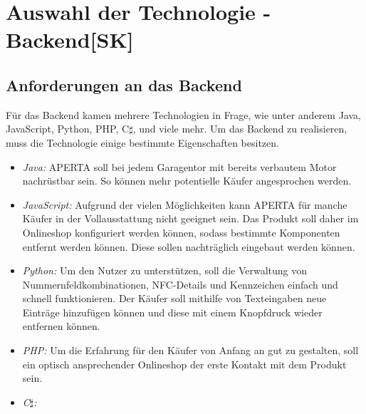 \section{Auswahl der Technologie - Backend[SK]}
\subsection{Anforderungen an das Backend}
Für das Backend kamen mehrere Technologien in Frage, wie unter anderem Java, JavaScript, Python, PHP, C$\sharp$, und viele mehr. 
Um das Backend zu realisieren, muss die Technologie einige bestimmte Eigenschaften besitzen. 
\begin{itemize}
    \item \textit{Java:} APERTA soll bei jedem Garagentor mit bereits verbautem Motor nachrüstbar sein. So können mehr potentielle Käufer angesprochen werden.
    \item \textit{JavaScript:} Aufgrund der vielen Möglichkeiten kann APERTA für manche Käufer in der Vollausstattung nicht geeignet sein. Das Produkt soll daher im Onlineshop konfiguriert werden können, sodass bestimmte Komponenten entfernt werden können. Diese sollen nachträglich eingebaut werden können.
    \item \textit{Python:} Um den Nutzer zu unterstützen, soll die Verwaltung von Nummernfeldkombinationen, NFC-Details und Kennzeichen einfach und schnell funktionieren. Der Käufer soll mithilfe von Texteingaben neue Einträge hinzufügen können und diese mit einem Knopfdruck wieder entfernen können.
    \item \textit{PHP:}
    Um die Erfahrung für den Käufer von Anfang an gut zu gestalten, soll ein optisch ansprechender Onlineshop der erste Kontakt mit dem Produkt sein.
    \item \textit{C$\sharp$: }
  \end{itemize}


